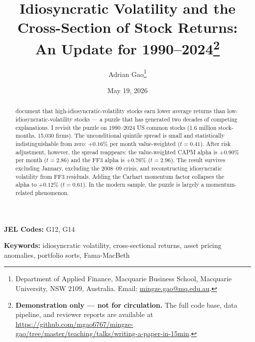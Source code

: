 \documentclass[12pt]{article}
\title{Idiosyncratic Volatility and the Cross-Section of Stock Returns:\\
An Update for 1990--2024\thanks{\textbf{Demonstration only --- not for circulation.}
The full code base, data pipeline, and reviewer reports are 
available at \url{https://github.com/mgao6767/mingze-gao/tree/master/teaching/talks/writing-a-paper-in-15min}.}}
\author{Adrian Gao\thanks{Department of Applied Finance, Macquarie Business School,
Macquarie University, NSW 2109, Australia. Email: \href{mailto:mingze.gao@mq.edu.au}{mingze.gao@mq.edu.au}.}}
\date{May 19, 2026}
\newcommand{\1}[1]{\mathds{1}\left[#1\right]}
\begin{document}
\maketitle
\thispagestyle{empty}

\begin{center}
\end{center}
\vspace{0.5em}

\begin{abstract}
\noindent \singlespacing
\citet{ang2006cross} document that high-idiosyncratic-volatility stocks earn lower
average returns than low-idiosyncratic-volatility stocks --- a puzzle that has
generated two decades of competing explanations. I revisit the puzzle on 1990--2024
US common stocks (1.6 million stock-months, 15{,}030 firms). The unconditional
quintile spread is small and statistically indistinguishable from zero:
$+0.16\%$ per month value-weighted ($t=0.41$). After risk adjustment, however,
the spread reappears: the value-weighted CAPM alpha is $+0.90\%$ per month
($t=2.86$) and the FF3 alpha is $+0.76\%$ ($t=2.96$). The result survives
excluding January, excluding the 2008--09 crisis, and reconstructing
idiosyncratic volatility from FF3 residuals. Adding the Carhart momentum factor
collapses the alpha to $+0.12\%$ ($t=0.61$). In the modern sample, the puzzle
is largely a momentum-related phenomenon.
\end{abstract}

\vspace{1em}
\noindent \textbf{JEL Codes:} G12, G14

\noindent \textbf{Keywords:} idiosyncratic volatility, cross-sectional returns,
asset pricing anomalies, portfolio sorts, Fama-MacBeth
\end{document}
